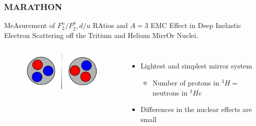 \documentclass[12pt,usenames,dvipsnames]{beamer}
\begin{document}
\begin{frame}
\frametitle{MARATHON}
\vspace{-10pt}
\begin{block}{}
MeAsurement of $F^n_2/F^p_2, d/u$ RAtios and $A=3$ EMC Effect in Deep Inelastic Electron Scattering off the Tritium and Helium MirrOr Nuclei.
\vspace{-10pt}
\begin{columns}[t]
	
	\vspace{-10pt}	
	\hspace{-10pt}
	\begin{figure}
		\includegraphics[width =5cm]{../images/mirror}
	\end{figure}
	
	\vspace{10pt}
	\begin{itemize}
		\item Lightest and simplest mirror system
		\begin{itemize}
			\item  Number of protons in $^3H =$ neutrons in $^3He$
		\end{itemize}
		\item Differences in the nuclear effects are small
	\end{itemize}
	
	
\end{columns}
\end{block}
\end{frame}
\end{document}
